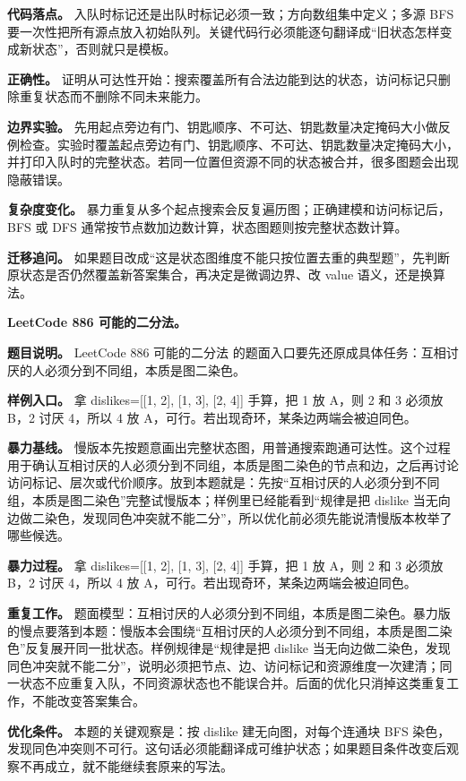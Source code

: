 \textbf{代码落点。} 入队时标记还是出队时标记必须一致；方向数组集中定义；多源 BFS 要一次性把所有源点放入初始队列。关键代码行必须能逐句翻译成“旧状态怎样变成新状态”，否则就只是模板。

\textbf{正确性。} 证明从可达性开始：搜索覆盖所有合法边能到达的状态，访问标记只删除重复状态而不删除不同未来能力。

\textbf{边界实验。} 先用起点旁边有门、钥匙顺序、不可达、钥匙数量决定掩码大小做反例检查。实验时覆盖起点旁边有门、钥匙顺序、不可达、钥匙数量决定掩码大小，并打印入队时的完整状态。若同一位置但资源不同的状态被合并，很多图题会出现隐蔽错误。

\textbf{复杂度变化。} 暴力重复从多个起点搜索会反复遍历图；正确建模和访问标记后，BFS 或 DFS 通常按节点数加边数计算，状态图题则按完整状态数计算。

\textbf{迁移追问。} 如果题目改成“这是状态图维度不能只按位置去重的典型题”，先判断原状态是否仍然覆盖新答案集合，再决定是微调边界、改 value 语义，还是换算法。

\noindent\textbf{LeetCode 886 可能的二分法。}

\textbf{题目说明。} LeetCode 886 可能的二分法 的题面入口要先还原成具体任务：互相讨厌的人必须分到不同组，本质是图二染色。

\textbf{样例入口。} 拿 dislikes=[[1, 2], [1, 3], [2, 4]] 手算，把 1 放 A，则 2 和 3 必须放 B，2 讨厌 4，所以 4 放 A，可行。若出现奇环，某条边两端会被迫同色。

\textbf{暴力基线。} 慢版本先按题意画出完整状态图，用普通搜索跑通可达性。这个过程用于确认互相讨厌的人必须分到不同组，本质是图二染色的节点和边，之后再讨论访问标记、层次或代价顺序。放到本题就是：先按“互相讨厌的人必须分到不同组，本质是图二染色”完整试慢版本；样例里已经能看到“规律是把 dislike 当无向边做二染色，发现同色冲突就不能二分”，所以优化前必须先能说清慢版本枚举了哪些候选。

\textbf{暴力过程。} 拿 dislikes=[[1, 2], [1, 3], [2, 4]] 手算，把 1 放 A，则 2 和 3 必须放 B，2 讨厌 4，所以 4 放 A，可行。若出现奇环，某条边两端会被迫同色。

\textbf{重复工作。} 题面模型：互相讨厌的人必须分到不同组，本质是图二染色。暴力版的慢点要落到本题：慢版本会围绕“互相讨厌的人必须分到不同组，本质是图二染色”反复展开同一批状态。样例规律是“规律是把 dislike 当无向边做二染色，发现同色冲突就不能二分”，说明必须把节点、边、访问标记和资源维度一次建清；同一状态不应重复入队，不同资源状态也不能误合并。后面的优化只消掉这类重复工作，不能改变答案集合。

\textbf{优化条件。} 本题的关键观察是：按 dislike 建无向图，对每个连通块 BFS 染色，发现同色冲突则不可行。这句话必须能翻译成可维护状态；如果题目条件改变后观察不再成立，就不能继续套原来的写法。

